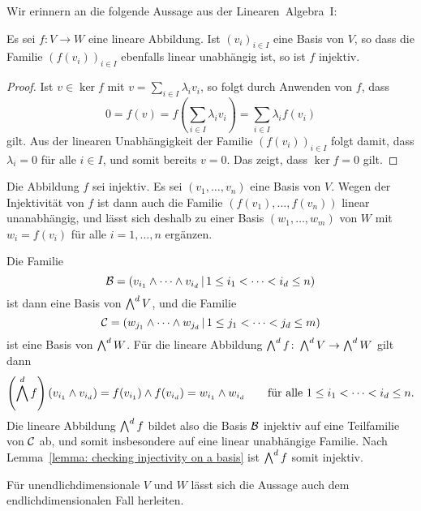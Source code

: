 Wir erinnern an die folgende Aussage aus der Linearen~Algebra~I:

\begin{lemma}
  \label{lemma: checking injectivity on a basis}
  Es sei $f \colon V \to W$ eine lineare Abbildung.
  Ist $(v_i)_{i \in I}$ eine Basis von $V$, so dass die Familie $(f(v_i))_{i \in I}$ ebenfalls linear unabhängig ist, so ist $f$ injektiv.
\end{lemma}

\begin{proof}
  Ist $v \in \ker f$ mit $v = \sum_{i \in I} \lambda_i v_i$, so folgt durch Anwenden von $f$, dass
  \[
      0
    = f(v)
    = f\left( \sum_{i \in I} \lambda_i v_i \right)
    = \sum_{i \in I} \lambda_i f(v_i)
  \]
  gilt.
  Aus der linearen Unabhängigkeit der Familie $(f(v_i))_{i \in I}$ folgt damit, dass $\lambda_i = 0$ für alle $i \in I$, und somit bereits $v = 0$.
  Das zeigt, dass $\ker f = 0$ gilt.
\end{proof}

Die Abbildung $f$ sei injektiv.
Es sei $(v_1, \dotsc, v_n)$ eine Basis von $V$.
Wegen der Injektivität von $f$ ist dann auch die Familie $(f(v_1), \dotsc, f(v_n))$ linear unanabhängig, und lässt sich deshalb zu einer Basis $(w_1, \dotsc, w_m)$ von $W$ mit $w_i = f(v_i)$ für alle $i = 1, \dotsc, n$ ergänzen.

Die Familie
\[
    \mathcal{B}
  = (
      v_{i_1} \wedge \dotsb \wedge v_{i_d}
      \,|\,
      1 \leq i_1 < \dotsb < i_d \leq n
    )
\]
ist dann eine Basis von $\bigwedge^{d} V$, und die Familie
\[
    \mathcal{C}
  = (
      w_{j_1} \wedge \dotsb \wedge w_{j_d}
      \,|\,
      1 \leq j_1 < \dotsb < j_d \leq m
    )
\]
ist eine Basis von $\bigwedge^{d} W$.
Für die lineare Abbildung $\bigwedge^{d} f \colon \bigwedge^{d} V \to \bigwedge^{d} W$ gilt dann
\[
    \left(\bigwedge^{d} f\right)(v_{i_1} \wedge v_{i_d})
  = f(v_{i_1}) \wedge f(v_{i_d})
  = w_{i_1} \wedge w_{i_d}
  \qquad
  \text{für alle $1 \leq i_1 < \dotsb < i_d \leq n$}.
\]
Die lineare Abbildung $\bigwedge^{d} f$ bildet also die Basis $\mathcal{B}$ injektiv auf eine Teilfamilie von $\mathcal{C}$ ab, und somit insbesondere auf eine linear unabhängige Familie.
Nach Lemma~\ref{lemma: checking injectivity on a basis} ist $\bigwedge^{d} f$ somit injektiv.

\begin{remark}
  Für unendlichdimensionale $V$ und $W$ lässt sich die Aussage auch dem endlichdimensionalen Fall herleiten.
\end{remark}





